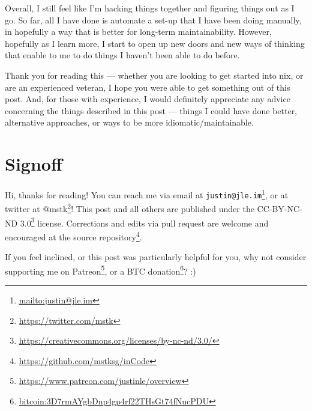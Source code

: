\documentclass[]{article}
\renewcommand{\href}[2]{#2\footnote{\url{#1}}}
\begin{document}
Overall, I still feel like I'm hacking things together and figuring things out
as I go. So far, all I have done is automate a set-up that I have been doing
manually, in hopefully a way that is better for long-term maintainability.
However, hopefully as I learn more, I start to open up new doors and new ways of
thinking that enable to me to do things I haven't been able to do before.

Thank you for reading this --- whether you are looking to get started into nix,
or are an experienced veteran, I hope you were able to get something out of this
post. And, for those with experience, I would definitely appreciate any advice
concerning the things described in this post --- things I could have done
better, alternative approaches, or ways to be more idiomatic/maintainable.

\section{Signoff}\label{signoff}

Hi, thanks for reading! You can reach me via email at
\href{mailto:justin@jle.im}{\nolinkurl{justin@jle.im}}, or at twitter at
\href{https://twitter.com/mstk}{@mstk}! This post and all others are published
under the \href{https://creativecommons.org/licenses/by-nc-nd/3.0/}{CC-BY-NC-ND
3.0} license. Corrections and edits via pull request are welcome and encouraged
at \href{https://github.com/mstksg/inCode}{the source repository}.

If you feel inclined, or this post was particularly helpful for you, why not
consider \href{https://www.patreon.com/justinle/overview}{supporting me on
Patreon}, or a \href{bitcoin:3D7rmAYgbDnp4gp4rf22THsGt74fNucPDU}{BTC donation}?
:)
\end{document}

